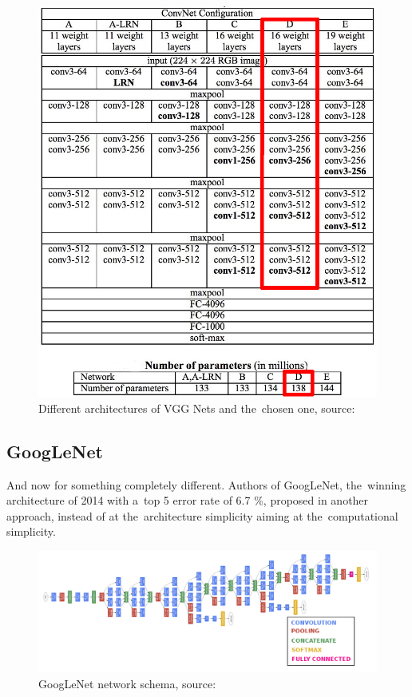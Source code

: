 \begin{figure}[H]
   \centering
	\includegraphics[width=0.8\linewidth]{./pictures/vgg-net.png}
	\caption[VGG Net networks]{Different architectures of VGG Nets and the~chosen
	one, source: \cite{vgg}}
      \label{fig:vgg}
\end{figure}




\subsection{GoogLeNet}
\label{googlenet}

And now for something completely different. Authors of GoogLeNet, the~winning 
architecture of  2014 with a~top 5 error rate of 6.7 \%, proposed in
\cite{googlenet} another approach, instead of at the~architecture simplicity 
aiming at the~computational simplicity.

\begin{figure}[H]
   \centering
	\includegraphics[width=\linewidth]{./pictures/googlenet.png}
	\caption[GoogLeNet networks]{GoogLeNet network schema, source: 
	\cite{googlenet}}
      \label{fig:googlenet}
\end{figure}

